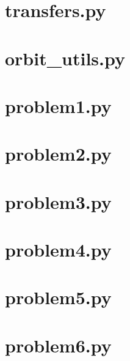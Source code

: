 \section{transfers.py}

\clearpage

\section{orbit\_utils.py}

\clearpage

\section{problem1.py}

\clearpage

\section{problem2.py}

\clearpage

\section{problem3.py}

\clearpage

\section{problem4.py}

\clearpage

\section{problem5.py}

\clearpage

\section{problem6.py}

